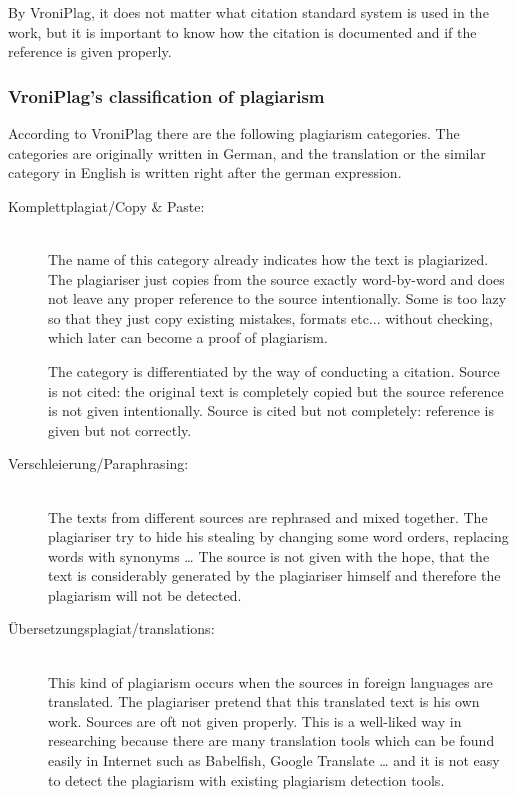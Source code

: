 By VroniPlag, it does not matter what citation standard system is used in the work, but it is important to know how the 
citation is documented and if the reference is given properly.

\subsubsection{VroniPlag’s classification of plagiarism}\label{sec:classification}

According to VroniPlag there are the following plagiarism categories. 
The categories are originally written in German, and the translation or the similar category in English is written 
right after the german expression.

\begin{description}
\item[Komplettplagiat/Copy \& Paste:] \hfill \\
The name of this category already indicates how the text is plagiarized. The 
plagiariser just copies from the source exactly word-by-word and does not leave any proper reference to the source 
intentionally. Some is too lazy so that they just copy existing mistakes, formats etc... without checking, which 
later can become a proof of plagiarism.

The category is differentiated by the way of conducting a citation.
Source is not cited: the original text is completely copied but the source reference is not given intentionally.
Source is cited but not completely: reference is given but not correctly.  

\item[Verschleierung/Paraphrasing:]  \hfill \\
The texts from different sources are rephrased and mixed together. The plagiariser try 
to hide his stealing by changing some word orders, replacing words with synonyms … The source is not given with the hope, 
that the text is considerably generated by the plagiariser himself and therefore the plagiarism will not be detected.

\item[Übersetzungsplagiat/translations:] \hfill \\
This kind of plagiarism occurs when the sources in foreign languages are translated. 
The plagiariser pretend that this translated text is his own work. Sources are oft not given properly. This is a 
well-liked way in researching because there are many translation tools which can be found easily in Internet such as 
Babelfish, Google Translate … and  it is not easy to detect the plagiarism with existing plagiarism detection tools.


\end{description}
